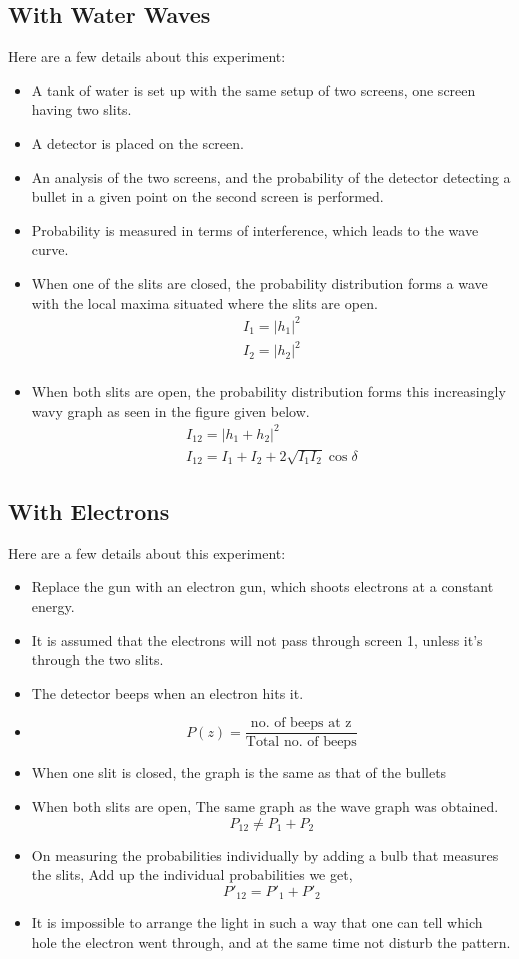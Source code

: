 \documentclass{report}
\begin{document}
\subsection{With Water Waves}
Here are a few details about this experiment:
\begin{itemize}
	\item A tank of water is set up with the same setup of two screens, one screen having two slits.
	\item A detector is placed on the screen.
	\item An analysis of the two screens, and the probability of the detector detecting a bullet in a given point on the second screen is performed.
	\item Probability is measured in terms of interference, which leads to the wave curve.
	\item When one of the slits are closed, the probability distribution forms a wave with the local maxima situated where the slits are open.
		\begin{align*}
			I_1 = |h_1|^2  \\
			I_2 = |h_2|^2 \\
		\end{align*}
	\item When both slits are open, the probability distribution forms this increasingly wavy graph as seen in the figure given below.
		\begin{align*}
			I_{12} = |h_1 + h_2|^2 \\
			I_{12} = I_1 + I_2 + 2 \sqrt{I_1I_2}\cos{\delta}
		\end{align*}
\end{itemize}
\subsection{With Electrons}
Here are a few details about this experiment:
\begin{itemize}
	\item Replace the gun with an electron gun, which shoots electrons at a constant energy.
	\item It is assumed that the electrons will not pass through screen 1, unless it's through the two slits.
	\item The detector beeps when an electron hits it.
	\item $$P(z) = \frac{\text{no. of beeps at z}}{\text{Total no. of beeps}} $$
	\item When one slit is closed, the graph is the same as that of the bullets
	\item When both slits are open, The same graph as the wave graph was obtained.
		\[
			P_{12} \neq P_1 + P_2
		\]
	\item On measuring the probabilities individually by adding a bulb that measures the slits, Add up the individual probabilities we get,
		\[
			P'_{12} = P'_1 + P'_2
		\]
	\item It is impossible to arrange the light in such a way that one can tell which hole the electron went through, and at the same time not disturb the pattern.
\end{itemize}
\end{document}
